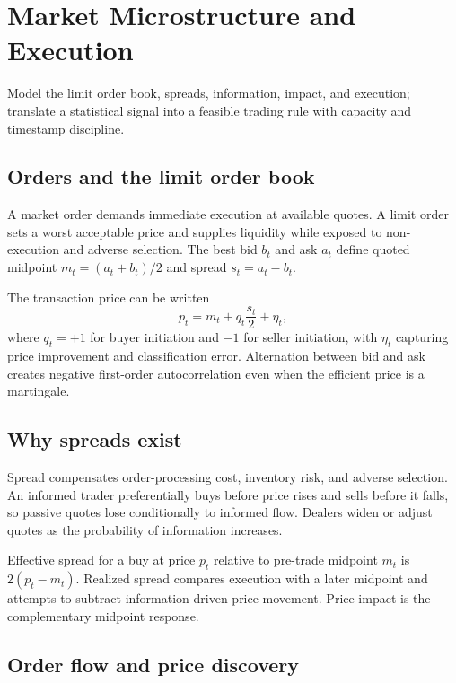 \chapter{Market Microstructure and Execution}

\begin{objectives}
Model the limit order book, spreads, information, impact, and execution; translate a
statistical signal into a feasible trading rule with capacity and timestamp
discipline.
\end{objectives}

\section{Orders and the limit order book}

A market order demands immediate execution at available quotes. A limit order sets
a worst acceptable price and supplies liquidity while exposed to non-execution and
adverse selection. The best bid $b_t$ and ask $a_t$ define quoted midpoint
$m_t=(a_t+b_t)/2$ and spread $s_t=a_t-b_t$.

The transaction price can be written
\[
p_t=m_t+q_t\frac{s_t}{2}+\eta_t,
\]
where $q_t=+1$ for buyer initiation and $-1$ for seller initiation, with $\eta_t$
capturing price improvement and classification error. Alternation between bid and
ask creates negative first-order autocorrelation even when the efficient price is a
martingale.

\section{Why spreads exist}

Spread compensates order-processing cost, inventory risk, and adverse selection.
An informed trader preferentially buys before price rises and sells before it falls,
so passive quotes lose conditionally to informed flow. Dealers widen or adjust
quotes as the probability of information increases.

Effective spread for a buy at price $p_t$ relative to pre-trade midpoint $m_t$ is
$2(p_t-m_t)$. Realized spread compares execution with a later midpoint and attempts
to subtract information-driven price movement. Price impact is the complementary
midpoint response.

\section{Order flow and price discovery}

